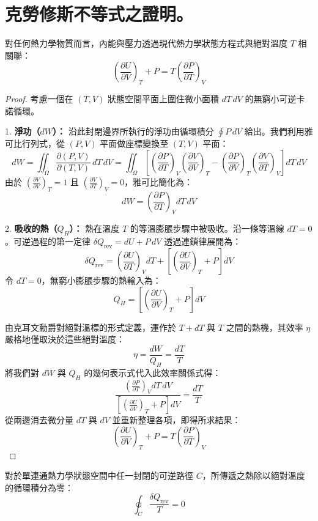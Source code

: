 \section{克勞修斯不等式之證明。} \label{sec:clausius_inequality}
\begin{lemma}
對任何熱力學物質而言，內能與壓力透過現代熱力學狀態方程式與絕對溫度 $T$ 相關聯：
\[
\left(\frac{\partial U}{\partial V}\right)_T + P = T\left(\frac{\partial P}{\partial T}\right)_V
\]
\end{lemma}

\begin{proof}
考慮一個在 $(T,V)$ 狀態空間平面上圍住微小面積 $dT\,dV$ 的無窮小可逆卡諾循環。

1. \textbf{淨功（$dW$）：} 沿此封閉邊界所執行的淨功由循環積分 $\oint P\,dV$ 給出。我們利用雅可比行列式，從 $(P,V)$ 平面做座標變換至 $(T,V)$ 平面：
\[
dW = \iint_\Omega \frac{\partial(P,V)}{\partial(T,V)}\,dT\,dV = \iint_\Omega \left[ \left(\frac{\partial P}{\partial T}\right)_V \left(\frac{\partial V}{\partial V}\right)_T - \left(\frac{\partial P}{\partial V}\right)_T \left(\frac{\partial V}{\partial T}\right)_V \right] dT\,dV
\]
由於 $\left(\frac{\partial V}{\partial V}\right)_T = 1$ 且 $\left(\frac{\partial V}{\partial T}\right)_V = 0$，雅可比簡化為：
\[
dW = \left(\frac{\partial P}{\partial T}\right)_V dT\,dV
\]

2. \textbf{吸收的熱（$Q_H$）：} 熱在溫度 $T$ 的等溫膨脹步驟中被吸收。沿一條等溫線 $dT = 0$。可逆過程的第一定律 $\delta Q_{\text{rev}} = dU + P\,dV$ 透過連鎖律展開為：
\[
\delta Q_{\text{rev}} = \left(\frac{\partial U}{\partial T}\right)_V dT + \left[\left(\frac{\partial U}{\partial V}\right)_T + P\right] dV
\]
令 $dT = 0$，無窮小膨脹步驟的熱輸入為：
\[
Q_H = \left[\left(\frac{\partial U}{\partial V}\right)_T + P\right] dV
\]

由克耳文勳爵對絕對溫標的形式定義，運作於 $T+dT$ 與 $T$ 之間的熱機，其效率 $\eta$ 嚴格地僅取決於這些絕對溫度：
\[
\eta = \frac{dW}{Q_H} = \frac{dT}{T}
\]
將我們對 $dW$ 與 $Q_H$ 的幾何表示式代入此效率關係式得：
\[
\frac{\left(\frac{\partial P}{\partial T}\right)_V dT\,dV}{\left[\left(\frac{\partial U}{\partial V}\right)_T + P\right] dV} = \frac{dT}{T}
\]
從兩邊消去微分量 $dT$ 與 $dV$ 並重新整理各項，即得所求結果：
\[
\left(\frac{\partial U}{\partial V}\right)_T + P = T\left(\frac{\partial P}{\partial T}\right)_V
\]
\end{proof}

\begin{theorem}[克勞修斯等式]
對於單連通熱力學狀態空間中任一封閉的可逆路徑 $C$，所傳遞之熱除以絕對溫度的循環積分為零：
\[
\oint_C \frac{\delta Q_{\text{rev}}}{T} = 0
\]
\end{theorem}

